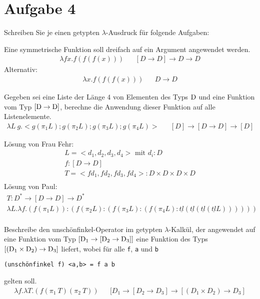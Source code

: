 \documentclass[ngerman,a4paper]{report}
\begin{document}
\section*{Aufgabe 4}
Schreiben Sie je einen getypten $\lambda$-Ausdruck für folgende Aufgaben:
\begin{compactenum}
\item Eine symmetrische Funktion soll dreifach auf ein Argument angewendet werden.
\begin{align*}
	\lambda fx.f(f(f(x)))&& [D \rightarrow D] \rightarrow D \rightarrow D
\end{align*}
Alternativ:
\begin{align*}
	\lambda x.f(f(f(x)))&& D \rightarrow D
\end{align*}

\item Gegeben sei eine Liste der Länge $4$ von Elementen des Typs $\text{\lstinline!D!}$ und eine Funktion vom Typ $[\text{\lstinline!D!} \rightarrow \text{\lstinline!D!}]$, berechne die Anwendung dieser Funktion auf alle Listenelemente.
\begin{align*}
	\lambda L\ g.<g(\pi_1L);g(\pi_2L);g(\pi_3L);g(\pi_4L)>&& [D] \rightarrow [D\rightarrow D] \rightarrow [D]
\end{align*}

Lösung von Frau Fehr:
\begin{align*}
L = <d_1, d_2, d_3, d_4> \text{ mit } d_i : D\\
f : [D \rightarrow D]\\
T = <f d_1, f d_2, f d_3, f d_4> : D \times D \times D \times D\\
\end{align*}
Lösung von Paul:
\begin{align*}
T: D^* \rightarrow [D \rightarrow D] \rightarrow D^*\\
\lambda L.\lambda f. (f (\pi_1 L)):(f (\pi_2 L):(f (\pi_3 L):(f (\pi_4 L) : \underline{tl} (\underline{tl} (\underline{tl} (\underline{tl} L))))))\\
\end{align*}

\item Beschreibe den unschönfinkel-Operator im getypten $\lambda$-Kalkül, der angewendet auf eine Funktion vom Typ $[\text{\lstinline!D!}_1 \rightarrow [\text{\lstinline!D!}_2 \rightarrow \text{\lstinline!D!}_3]]$ eine Funktion des Typs $[(\text{\lstinline!D!}_1 \times \text{\lstinline!D!}_2) \rightarrow \text{\lstinline!D!}_3]$ liefert, wobei für alle \lstinline!f!, \lstinline!a! und \lstinline!b!
\begin{lstlisting}
(unschönfinkel f) <a,b> = f a b
\end{lstlisting}
gelten soll.
\begin{align*}
	\lambda f. \lambda T.(f(\pi_1\ T) (\pi_2\ T))&& [D_1 \rightarrow [D_2 \rightarrow D_3] \rightarrow [(D_1\times D_2)\rightarrow D_3]
\end{align*}
\end{compactenum}
\end{document}
